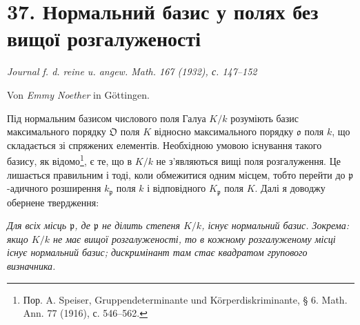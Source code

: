 \documentclass[11pt]{article}
\providecommand{\frakO}{\mathfrak{O}}
\providecommand{\frako}{\mathfrak{o}}
\providecommand{\frakp}{\mathfrak{p}}
\begin{document}
\section*{37. Нормальний базис у полях без вищої розгалуженості}

\begin{center}
\emph{Journal f. d. reine u. angew. Math. 167 (1932), с. 147--152}
\end{center}

\begin{center}
Von \emph{Emmy Noether} in Göttingen.
\end{center}

Під нормальним базисом числового поля Галуа \(K/k\) розуміють базис максимального порядку \(\frakO\) поля \(K\) відносно максимального порядку \(\frako\) поля \(k\), що складається зі спряжених елементів. Необхідною умовою існування такого базису, як відомо\footnote{Пор. A. Speiser, Gruppendeterminante und Körperdiskriminante, § 6. Math. Ann. 77 (1916), с. 546--562.}, є те, що в \(K/k\) не з'являються вищі поля розгалуження. Це лишається правильним і тоді, коли обмежитися одним місцем, тобто перейти до \(\frakp\)-адичного розширення \(k_\frakp\) поля \(k\) і відповідного \(K_\frakp\) поля \(K\). Далі я доводжу обернене твердження:

\emph{Для всіх місць \(\frakp\), де \(\frakp\) не ділить степеня \(K/k\), існує нормальний базис. Зокрема: якщо \(K/k\) не має вищої розгалуженості, то в кожному розгалуженому місці існує нормальний базис; дискримінант там стає квадратом групового визначника.}
\end{document}
